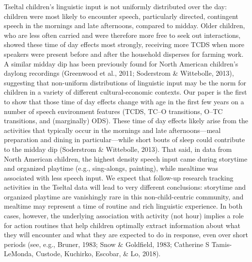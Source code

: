 \documentclass[floatsintext,man]{apa6}
\theoremstyle{definition}
\theoremstyle{definition}
\theoremstyle{definition}
\theoremstyle{remark}
\begin{document}
Tseltal children's linguistic input is not uniformly distributed over
the day: children were most likely to encounter speech, particularly
directed, contingent speech in the mornings and late afternoons,
compared to midday. Older children, who are less often carried and were
therefore more free to seek out interactions, showed these time of day
effects most strongly, receiving more TCDS when more speakers were
present before and after the household disperses for farming work. A
similar midday dip has been previously found for North American
children's daylong recordings (Greenwood et al., 2011; Soderstrom \&
Wittebolle, 2013), suggesting that non-uniform distributions of
linguistic input may be the norm for children in a variety of different
cultural-economic contexts. Our paper is the first to show that those
time of day effects change with age in the first few years on a number
of speech environment features (TCDS, TC--O transitions, O--TC
transitions, and (marginally) ODS). These time of day effects likely
arise from the activities that typically occur in the mornings and late
afternoons---meal preparation and dining in particular---while short
bouts of sleep could contribute to the midday dip (Soderstrom \&
Wittebolle, 2013). That said, in data from North American children, the
highest density speech input came during storytime and organized
playtime (e.g., sing-alongs, painting), while mealtime was associated
with less speech input. We expect that follow-up research tracking
activities in the Tseltal data will lead to very different conclusions:
storytime and organized playtime are vanishingly rare in this
non-child-centric community, and mealtime may represent a time of
routine and rich linguistic experience. In both cases, however, the
underlying association with activity (not hour) implies a role for
action routines that help children optimally extract information about
what they will encounter and what they are expected to do in response,
even over short periods (see, e.g., Bruner, 1983; Snow \& Goldfield,
1983; Catherine S Tamis-LeMonda, Custode, Kuchirko, Escobar, \& Lo,
2018).
\end{document}
